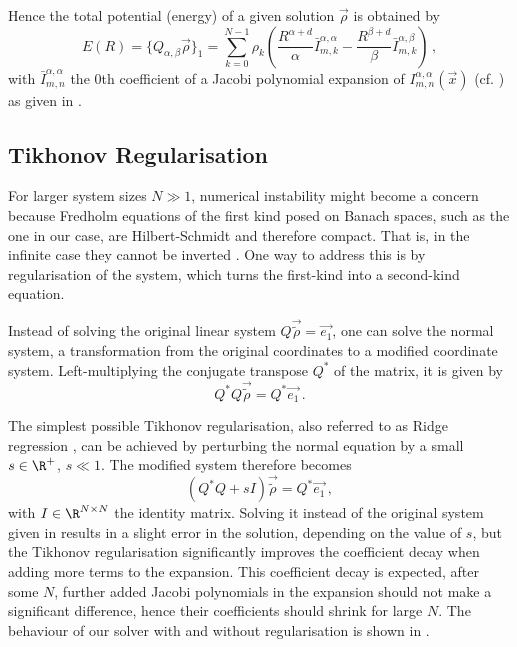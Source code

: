 
Hence the total potential (energy) of a given solution $\vec{\rho}$ is obtained by
\begin{equation}
  E(R) = \{Q_{\alpha,\beta} \vec{\rho}\}_1 = \sum_{k=0}^{N-1} \rho_k \left(\frac{R^{\alpha+d}}{\alpha} \bar{I}_{m,k}^{\alpha,\alpha} - \frac{R^{\beta+d}}{\beta} \bar{I}_{m,k}^{\alpha,\beta}\right)\,,
  \label{eq:total-energy-for-ansatz}
\end{equation}
with $\bar{I}_{m,n}^{\alpha,\alpha}$ the 0th coefficient of a Jacobi polynomial expansion of $I_{m,n}^{\alpha,\alpha}(\vec{x})$ (cf. ) as given in .

\subsection{Tikhonov Regularisation}
\label{sec:regularisation}
For larger system sizes $N \gg 1$, numerical instability might become a concern because Fredholm equations of the first kind posed on Banach spaces, such as the one in our case, are Hilbert-Schmidt and therefore compact.
That is, in the infinite case they cannot be inverted \parencite{2021-arbitrary-dimensions}.
One way to address this is by regularisation of the system, which turns the first-kind into a second-kind equation.

Instead of solving the original linear system $Q \vec{\tilde{\rho}} = \vec{e_1}$, one can solve the normal system, a transformation from the original coordinates to a modified coordinate system.
Left-multiplying the conjugate transpose $Q^*$ of the matrix, it is given by
$$Q^* Q \vec{\tilde{\rho}} = Q^* \vec{e_1}\,.$$

The simplest possible Tikhonov regularisation, also referred to as Ridge regression \parencite{1970-ridge-regression}, can be achieved by perturbing the normal equation by a small $s \in \R^+$, $s \ll 1$.
The modified system therefore becomes
$$(Q^* Q + sI) \vec{\tilde{\rho}} = Q^* \vec{e_1}\,,$$
with $I \in \R^{N \times N}$ the identity matrix.
Solving it instead of the original system given in  results in a slight error in the solution, depending on the value of $s$, but the Tikhonov regularisation significantly improves the coefficient decay when adding more terms to the expansion.
This coefficient decay is expected, after some $N$, further added Jacobi polynomials in the expansion should not make a significant difference, hence their coefficients should shrink for large $N$.
The behaviour of our solver with and without regularisation is shown in .
